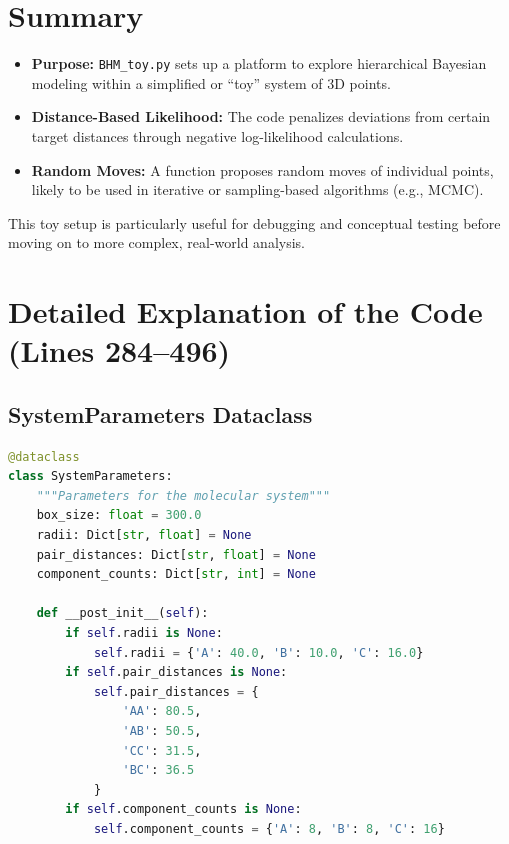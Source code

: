 \documentclass[12pt]{article}
\begin{document}
\section{Summary}
\begin{itemize}
  \item \textbf{Purpose:} \texttt{BHM\_toy.py} sets up a platform to explore hierarchical Bayesian modeling within a simplified or “toy” system of 3D points. 
  \item \textbf{Distance-Based Likelihood:} The code penalizes deviations from certain target distances through negative log-likelihood calculations. 
  \item \textbf{Random Moves:} A function proposes random moves of individual points, likely to be used in iterative or sampling-based algorithms (e.g., MCMC).
\end{itemize}

\noindent This toy setup is particularly useful for debugging and conceptual testing before moving on to more complex, real-world analysis.


\section{Detailed Explanation of the Code (Lines 284--496)}

\subsection{SystemParameters Dataclass}
\begin{lstlisting}[language=Python]
@dataclass
class SystemParameters:
    """Parameters for the molecular system"""
    box_size: float = 300.0
    radii: Dict[str, float] = None
    pair_distances: Dict[str, float] = None
    component_counts: Dict[str, int] = None
    
    def __post_init__(self):
        if self.radii is None:
            self.radii = {'A': 40.0, 'B': 10.0, 'C': 16.0}
        if self.pair_distances is None:
            self.pair_distances = {
                'AA': 80.5,
                'AB': 50.5,
                'CC': 31.5,
                'BC': 36.5
            }
        if self.component_counts is None:
            self.component_counts = {'A': 8, 'B': 8, 'C': 16}
\end{lstlisting}
\end{document}
